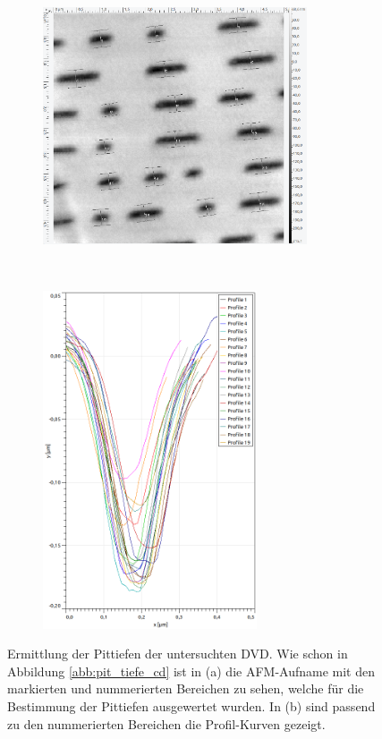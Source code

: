 %
\begin{figure}[H]
\centering
	\begin{subfigure}[t]{0.45\textwidth}
	\includegraphics[height=7cm]{AFM_auswertung/dvd_tiefe.png}
	\caption{}
	\end{subfigure}
	~
	\begin{subfigure}[t]{0.45\textwidth}
	\includegraphics[height=10cm]{AFM_auswertung/dvd_tiefe_grafik.png}
	\caption{}
	\label{abb:dvd_tiefe}
	\end{subfigure}
\caption{Ermittlung der Pittiefen der untersuchten DVD. Wie schon in Abbildung \ref{abb:pit_tiefe_cd} ist in (a) die AFM-Aufname mit den markierten und nummerierten Bereichen zu sehen, welche f\"ur die Bestimmung der Pittiefen ausgewertet wurden. In (b) sind passend zu den nummerierten Bereichen die Profil-Kurven gezeigt.}
\label{abb:pit_tiefe_dvd}
\end{figure}
%
